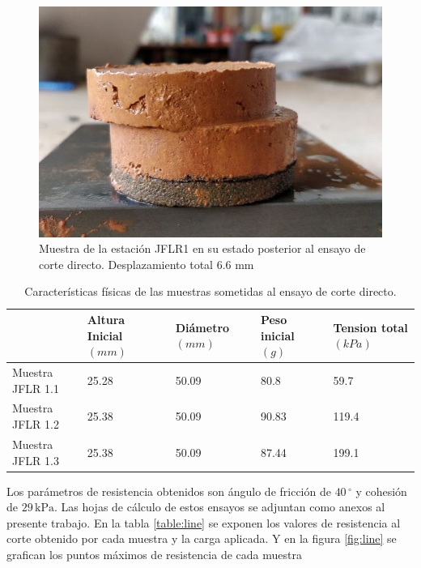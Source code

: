 \begin{figure}[H]
\centering
\includegraphics[scale=1]{img/fallada.jpg}
\caption{Muestra de la estaci\'on JFLR1 en su estado posterior al ensayo de corte directo.  Desplazamiento total 6.6 mm}
\label{fig:toma-bloque}
\end{figure}


\begin{table}[H]
\centering
\caption{Caracter\'isticas f\'isicas de las muestras sometidas al ensayo de corte directo. }
\begin{tabular}{l|l|l|l|l|}
\cline{2-5}
                                & Altura Inicial $\left( mm \right) $ &  Di\'ametro $\left( mm \right) $ & Peso inicial $\left( g \right) $ & Tension total$\left( kPa \right) $ \\ \hline
\multicolumn{1}{|l|}{Muestra JFLR 1.1} & 25.28          & 50.09    & 80.8             & 59.7               \\ \hline
\multicolumn{1}{|l|}{Muestra JFLR 1.2} & 25.38          & 50.09    & 90.83            & 119.4              \\ \hline
\multicolumn{1}{|l|}{Muestra JFLR 1.3} & 25.38          & 50.09    & 87.44            & 199.1              \\ \hline
\end{tabular}
\end{table}



Los par\'ametros de resistencia obtenidos son \'angulo de fricci\'on de \(40\,^\circ\) y cohesi\'on de \(29\,\text{kPa}\). Las hojas de c\'alculo de estos ensayos se adjuntan como anexos al presente trabajo.
En la tabla \ref{table:line}  se exponen los valores de resistencia al corte obtenido por cada muestra  y la carga aplicada. Y en la figura \ref{fig:line} se grafican los puntos m\'aximos de resistencia de cada muestra



